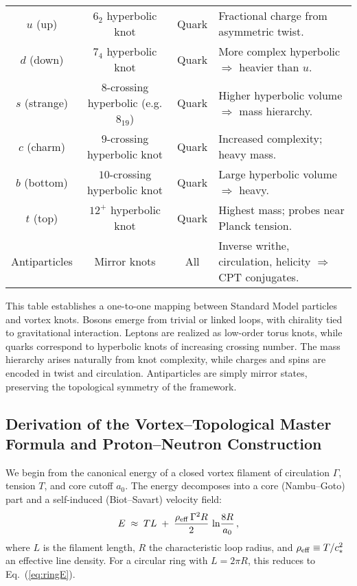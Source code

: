 \documentclass[12pt]{article}
\begin{document}
\begin{table}[h]
\begin{tabular}{|c|c|c|p{7.5cm}|}
\hline
$u$ (up) & $6_2$ hyperbolic knot & Quark & Fractional charge from asymmetric twist. \\
$d$ (down) & $7_4$ hyperbolic knot & Quark & More complex hyperbolic $\Rightarrow$ heavier than $u$. \\
$s$ (strange) & $8$-crossing hyperbolic (e.g. $8_{19}$) & Quark & Higher hyperbolic volume $\Rightarrow$ mass hierarchy. \\
$c$ (charm) & $9$-crossing hyperbolic knot & Quark & Increased complexity; heavy mass. \\
$b$ (bottom) & $10$-crossing hyperbolic knot & Quark & Large hyperbolic volume $\Rightarrow$ heavy. \\
$t$ (top) & $12^+$ hyperbolic knot & Quark & Highest mass; probes near Planck tension. \\
\hline
Antiparticles & Mirror knots & All & Inverse writhe, circulation, helicity $\Rightarrow$ CPT conjugates. \\
\hline
\end{tabular}
\end{table}

This table establishes a one-to-one mapping between Standard Model particles and vortex knots.
Bosons emerge from trivial or linked loops, with chirality tied to gravitational interaction.
Leptons are realized as low-order torus knots, while quarks correspond to hyperbolic knots of increasing crossing number.
The mass hierarchy arises naturally from knot complexity, while charges and spins are encoded in twist and circulation.
Antiparticles are simply mirror states, preserving the topological symmetry of the framework.

\subsection{Derivation of the Vortex--Topological Master Formula and Proton--Neutron Construction}

We begin from the canonical energy of a closed vortex filament of circulation $\Gamma$, tension $T$, and core cutoff $a_0$. The energy decomposes into a core (Nambu–Goto) part and a self-induced (Biot–Savart) velocity field:
\begin{equation}
E \;\approx\; T L \;+\; \frac{\rho_{\rm eff}\,\Gamma^2 R}{2}\,\ln\!\frac{8R}{a_0}\,,
\label{eq:ringE}
\end{equation}
where $L$ is the filament length, $R$ the characteristic loop radius, and $\rho_{\rm eff}\equiv T/c_*^2$ an effective line density. For a circular ring with $L=2\pi R$, this reduces to Eq.~(\ref{eq:ringE}).
\end{document}
